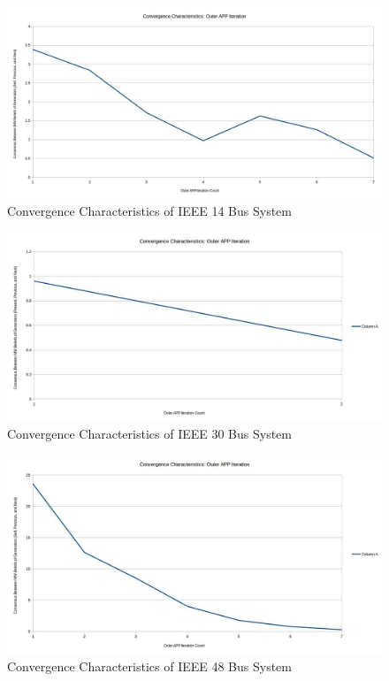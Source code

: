 \documentclass[preprint,12pt,3p]{elsarticle}
\begin{document}
	\begin{figure}
		\begin{center}
			\includegraphics[width=0.92\linewidth,trim=5mm 12mm 5mm 5mm, clip]{N_1_SCOPF_14_Bus.jpg}
			\caption{Convergence Characteristics of IEEE 14 Bus System}
			\label{14Conv}
		\end{center}
	\end{figure}
	\begin{figure}
		\begin{center}
			\includegraphics[width=0.92\linewidth,trim=5mm 12mm 5mm 5mm, clip]{N-1_SCOPF_30_Bus.jpg}
			\caption{Convergence Characteristics of IEEE 30 Bus System}
			\label{30Conv}
		\end{center}
	\end{figure}
	\begin{figure}
		\begin{center}
			\includegraphics[width=0.92\linewidth,trim=5mm 12mm 5mm 5mm, clip]{N-1_SCOPF_48_Bus.jpg}
			\caption{Convergence Characteristics of IEEE 48 Bus System}
			\label{48Conv}
		\end{center}
	\end{figure}
\end{document}
